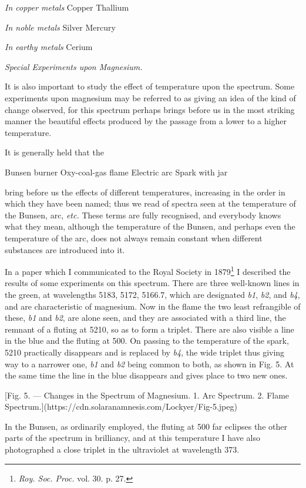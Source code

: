 \documentclass[a4paper, 12pt, oneside, polutonikogreek, english]{article}
\begin{document}
\emph{In copper metals} 
Copper 
Thallium 

\emph{In noble metals} 
Silver 
Mercury 

\emph{In earthy metals} 
Cerium  

\emph{Special Experiments upon Magnesium.}

It is also important to study the effect of temperature upon the spectrum. Some experiments upon magnesium may be referred to as giving an idea of the kind of change observed, for this spectrum perhaps brings before us in the most striking manner the beautiful effects produced by the passage from a lower to a higher temperature.

It is generally held that the

Bunsen burner 
Oxy-coal-gas flame 
Electric arc Spark with jar 

bring before us the effects of different temperatures, increasing in the order in which they have been named; thus we read of spectra seen at the temperature of the Bunsen, arc, \emph{etc.} These terms are fully recognised, and everybody knows what they mean, although the temperature of the Bunsen, and perhaps even the temperature of the arc, does not always remain constant when different substances are introduced into it.

In a paper which I communicated to the Royal Society in 1879\footnote{\emph{Roy. Soc. Proc.} vol. 30. p. 27.} I described the results of some experiments on this spectrum. There are three well-known lines in the green, at wavelengths 5183, 5172, 5166.7, which are designated \emph{b1}, \emph{b2}, and \emph{b4}, and are characteristic of magnesium. Now in the flame the two least refrangible of these, \emph{b1} and \emph{b2}, are alone seen, and they are associated with a third line, the remnant of a fluting at 5210, so as to form a triplet. There are also visible a line in the blue and the fluting at 500. On passing to the temperature of the spark, 5210 practically disappears and is replaced by \emph{b4}, the wide triplet thus giving way to a narrower one, \emph{b1} and \emph{b2} being common to both, as shown in Fig. 5. At the same time the line in the blue disappears and gives place to two new ones.

[Fig. 5. --- Changes in the Spectrum of Magnesium. 1. Arc Spectrum. 2. Flame Spectrum.](https://cdn.solaranamnesis.com/Lockyer/Fig-5.jpeg)

In the Bunsen, as ordinarily employed, the fluting at 500 far eclipses the other parts of the spectrum in brilliancy, and at this temperature I have also photographed a close triplet in the ultraviolet at wavelength 373.
\end{document}

